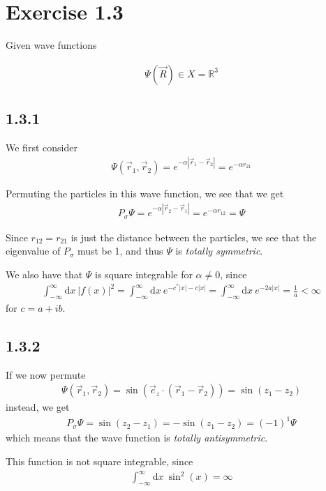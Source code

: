 \documentclass[norsk, 12pt]{article}
\title{}
\begin{document}
\section*{Exercise 1.3}

Given wave functions

\begin{align*}
	\Psi(\vec R) \in X= \mathbb{R}^3
\end{align*}

\subsection*{1.3.1}
We first consider
\begin{align*}
	\Psi(\vec r_1, \vec r_2) = e^{-\alpha |\vec r_1 - \vec r_2|} = e^{-\alpha r_{21}}
\end{align*}

Permuting the particles in this wave function, we see that we get
\begin{align*}
	P_{\sigma}\Psi = e^{-\alpha |\vec r_2 - \vec r_1|} = e^{-\alpha r_{12}} = \Psi
\end{align*}

Since $r_{12}=r_{21}$ is just the distance between the particles,
we see that the eigenvalue of $P_{\sigma}$ must be 1, and thus $\Psi$
is \textit{totally symmetric}.

We also have that $\Psi$ is square integrable for $\alpha \neq 0$, since
\begin{align*}
	\int_{-\infty}^{\infty} \mathrm{d}x\: |f(x)|^2 =
	\int_{-\infty}^{\infty} \mathrm{d}x\: e^{-c^*|x| - c|x|}=
	\int_{-\infty}^{\infty} \mathrm{d}x\: e^{-2a|x|}=\frac{1}{a}<\infty
\end{align*}
for $c = a + ib$.
\subsection*{1.3.2}
If we now permute
\begin{align*}
	\Psi(\vec r_1, \vec r_2) = \sin(\vec e_z\cdot(\vec r_1 - \vec r_2)) = \sin(z_1-z_2)
\end{align*}
instead, we get
\begin{align*}
	P_{\sigma}\Psi = \sin(z_2-z_1) = -\sin(z_1-z_2) = (-1)^1 \Psi
\end{align*}
which means that the wave function is \textit{totally antisymmetric}.

This function is not square integrable, since
\begin{align*}
	\int_{-\infty}^{\infty} \mathrm{d}x\: \sin^2(x) = \infty
\end{align*}
\end{document}
